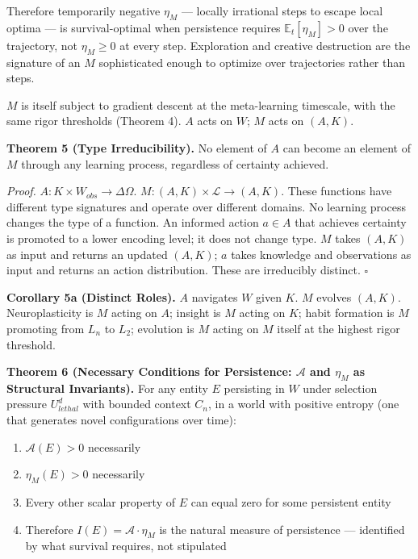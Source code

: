 \documentclass[
]{article}
\providecommand{\tightlist}{%
  \setlength{\itemsep}{0pt}\setlength{\parskip}{0pt}}
\begin{document}
Therefore temporarily negative \(\eta_M\) --- locally irrational steps
to escape local optima --- is survival-optimal when persistence requires
\(\mathbb{E}_t[\eta_M] > 0\) over the trajectory, not
\(\eta_M \geq 0\) at every step. Exploration and creative destruction
are the signature of an \(M\) sophisticated enough to optimize over
trajectories rather than steps.

\(M\) is itself subject to gradient descent at the meta-learning
timescale, with the same rigor thresholds (Theorem 4). \(A\) acts on
\(W\); \(M\) acts on \((A, K)\).

\textbf{Theorem 5 (Type Irreducibility).} No element of \(A\) can become
an element of \(M\) through any learning process, regardless of
certainty achieved.

\emph{Proof.} \(A : K \times W_{obs} \rightarrow \Delta \Omega\).
\(M : (A, K) \times \mathcal{L} \rightarrow (A, K)\). These functions
have different type signatures and operate over different domains. No
learning process changes the type of a function. An informed action
\(a \in A\) that achieves certainty is promoted to a lower encoding
level; it does not change type. \(M\) takes \((A, K)\) as input and
returns an updated \((A, K)\); \(a\) takes knowledge and observations as
input and returns an action distribution. These are irreducibly
distinct. \(\square\)

\textbf{Corollary 5a (Distinct Roles).} \(A\) navigates \(W\) given
\(K\). \(M\) evolves \((A, K)\). Neuroplasticity is \(M\) acting on
\(A\); insight is \(M\) acting on \(K\); habit formation is \(M\)
promoting from \(L_n\) to \(L_2\); evolution is \(M\) acting on \(M\)
itself at the highest rigor threshold.

\textbf{Theorem 6 (Necessary Conditions for Persistence: \(\mathcal{A}\)
and \(\eta_M\) as Structural Invariants).} For any entity \(E\)
persisting in \(W\) under selection pressure \(U_{lethal}^d\) with
bounded context \(C_n\), in a world with positive entropy (one that
generates novel configurations over time):

\begin{enumerate}
\def\labelenumi{\arabic{enumi}.}
\tightlist
\item
  \(\mathcal{A}(E) > 0\) necessarily
\item
  \(\eta_M(E) > 0\) necessarily
\item
  Every other scalar property of \(E\) can equal zero for some
  persistent entity
\item
  Therefore \(I(E) = \mathcal{A} \cdot \eta_M\) is the natural measure
  of persistence --- identified by what survival requires, not
  stipulated
\end{enumerate}
\end{document}
